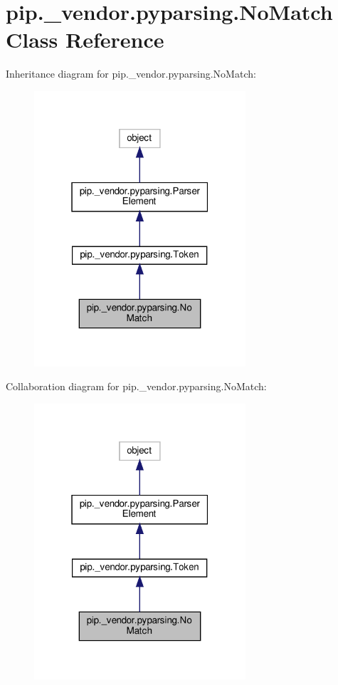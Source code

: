 \hypertarget{classpip_1_1__vendor_1_1pyparsing_1_1NoMatch}{}\section{pip.\+\_\+vendor.\+pyparsing.\+No\+Match Class Reference}
\label{classpip_1_1__vendor_1_1pyparsing_1_1NoMatch}


Inheritance diagram for pip.\+\_\+vendor.\+pyparsing.\+No\+Match\+:
\nopagebreak
\begin{figure}[H]
\begin{center}
\leavevmode
\includegraphics[width=223pt]{classpip_1_1__vendor_1_1pyparsing_1_1NoMatch__inherit__graph}
\end{center}
\end{figure}


Collaboration diagram for pip.\+\_\+vendor.\+pyparsing.\+No\+Match\+:
\nopagebreak
\begin{figure}[H]
\begin{center}
\leavevmode
\includegraphics[width=223pt]{classpip_1_1__vendor_1_1pyparsing_1_1NoMatch__coll__graph}
\end{center}
\end{figure}
